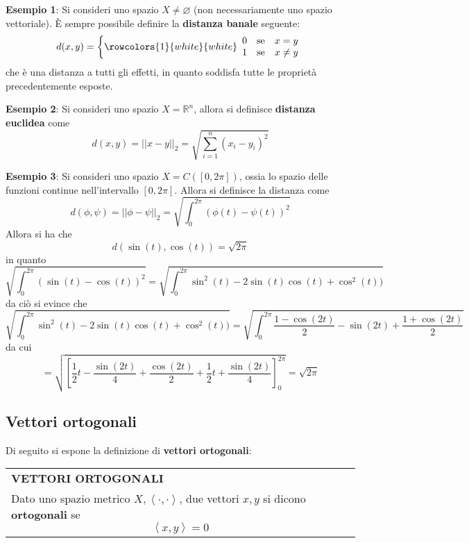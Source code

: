 \documentclass[a4paper]{extarticle}
\renewcommand\arraystretch{}
\begin{document}
\vspace{2em}
\noindent
\textbf{Esempio 1}: Si consideri uno spazio $X \neq \varnothing$ (non necessariamente uno spazio vettoriale). È sempre possibile definire la \textbf{distanza banale} seguente:
\[
    d(x,y) = \left\{
        \rowcolors{1}{white}{white}
        \begin{array}{lll}
            0 & \text{se} & x=y\\
            1 & \text{se} & x \neq y\\
        \end{array}
    \right.
\]
che è una distanza a tutti gli effetti, in quanto soddisfa tutte le proprietà precedentemente esposte.

\vspace{1em}
\noindent
\textbf{Esempio 2}: Si consideri uno spazio $X=\mathbb{R}^n$, allora si definisce \textbf{distanza euclidea} come
\[d(x,y) = \vert \vert x-y \vert \vert_2 = \sqrt{\sum_{i=1}^n (x_i-y_i)^2}\]

\vspace{1em}
\noindent
\textbf{Esempio 3}: Si consideri uno spazio $X=C([0,2 \pi])$, ossia lo spazio delle funzioni continue nell'intervallo $[0,2\pi]$. Allora si definisce la distanza come
\[d(\phi,\psi) = \vert \vert \phi-\psi \vert \vert_2 = \sqrt{\int_0^{2\pi} (\phi(t) - \psi(t))^2}\]
Allora si ha che
\[d(\sin(t),\cos(t)) = \sqrt{2\pi}\]
in quanto
\[\sqrt{\int_0^{2\pi} (\sin(t) - \cos(t))^2} = \sqrt{\int_0^{2\pi} \sin^2(t) - 2 \sin(t) \cos(t) + \cos^2(t))}\]
da ciò si evince che 
\[\sqrt{\int_0^{2\pi} \sin^2(t) - 2 \sin(t) \cos(t) + \cos^2(t))} = \sqrt{\int_0^{2\pi} \dfrac{1-\cos(2t)}{2} - \sin(2t) + \dfrac{1+\cos(2t)}{2}}\]
da cui
\[= \sqrt{\left[\dfrac{1}{2}t - \dfrac{\sin(2t)}{4} + \dfrac{\cos(2t)}{2} + \dfrac{1}{2}t + \dfrac{\sin(2t)}{4}\right]_0^{2\pi}} = \sqrt{2\pi}\]

\vspace{1em}
\subsection{Vettori ortogonali}
Di seguito si espone la definizione di \textbf{vettori ortogonali}:

\vspace{1em}
\setlength{\tabcolsep}{14pt}
\renewcommand{\arraystretch}{2}
\noindent
\begin{tabularx}{\textwidth}{@{}|P|@{}}
    \hline
    {\textbf{VETTORI ORTOGONALI}}\\
    \parbox{\linewidth}{Dato uno spazio metrico $X, \left<\cdot,\cdot\right>$, due vettori $x,y$ si dicono \textbf{ortogonali} se
    \[\left<x,y\right>=0\]
    \vspace{-1mm}}\\
    \hline
\end{tabularx}
\end{document}
